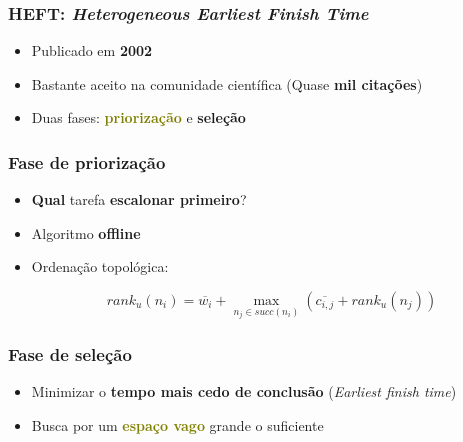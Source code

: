 \documentclass{beamer}
\newcommand{\colorize}[2]{\textbf{\textcolor{#1}{#2}}}
\begin{document}
\begin{frame}
\frametitle{HEFT: \emph{Heterogeneous Earliest Finish Time}}
\begin{itemize}
	\item Publicado em \colorize{n_green}{2002}
	\item Bastante aceito na comunidade científica (Quase \colorize{n_violet}{mil citações})
	\item Duas fases: \colorize{olive}{priorização} e \colorize{RawSienna}{seleção}
\end{itemize}

\end{frame}

\begin{frame}
\frametitle{Fase de priorização}
\begin{itemize}
	\item \colorize{n_red}{Qual} tarefa \colorize{n_red}{escalonar primeiro}?
	\item Algoritmo \colorize{n_green}{offline}
	\item Ordenação topológica:
	
	$$ rank_u(n_i) = \overline{w_i} + \max_{n_j \in succ(n_i)} (\overline{c_{i,j}} + rank_u(n_j)) $$
\end{itemize}
\end{frame}

\begin{frame}
\frametitle{Fase de seleção}
\begin{itemize}
	\item Minimizar o \colorize{n_red}{tempo mais cedo de conclusão} (\emph{Earliest finish time})
	\item Busca por um \colorize{olive}{espaço vago} grande o suficiente
\end{itemize}
\end{frame}
\end{document}
